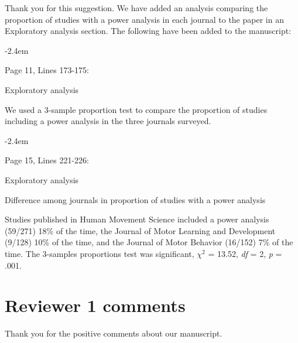 \documentclass[final]{article}
\renewenvironment{quote}{\begin{fquote}\advance\leftmargini -2.4em\begin{oldquote}}{\end{oldquote}\end{fquote}}
\newenvironment{fquote}
  {\def\FrameCommand{
	\fboxsep=0.6em %
	\fcolorbox{black}{white}}%
    \MakeFramed {\advance\hsize-2\width \FrameRestore}
    \begin{minipage}{\linewidth}
  }
  {\end{minipage}\endMakeFramed}
\newcommand{\TaskEstimationBox}[2]{%
\ifoptiondraft{\parbox{1.0\linewidth}{\hfill \hfill {\colorbox{#2}{\color{White} \textbf{#1}}}}}%
{}%
}
\def\Done {\TaskEstimationBox{Done}{Blue}}
\begin{document}
Thank you for this suggestion. We have added an analysis comparing the proportion of studies with a power analysis in each journal to the paper in an Exploratory analysis section. The following have been added to the manuscript:

\begin{quote}
Page 11, Lines 173-175:

Exploratory analysis

We used a 3-sample proportion test to compare the proportion of studies including a power analysis in the three journals surveyed.
\end{quote}

\begin{quote}
Page 15, Lines 221-226:

Exploratory analysis

Difference among journals in proportion of studies with a power analysis

Studies published in Human Movement Science included a power analysis (59/271) 18\% of the time, the Journal of Motor Learning and Development (9/128) 10\% of the time, and the Journal of Motor Behavior (16/152) 7\% of the time. The 3-samples proportions test was significant, \(\chi^2\) = 13.52, \emph{df} = 2, \emph{p} = .001.
\end{quote}

\Done

\hypertarget{reviewer-1-comments}{%
\section{Reviewer 1 comments}\label{reviewer-1-comments}}


Thank you for the positive comments about our manuscript.

\end{document}
